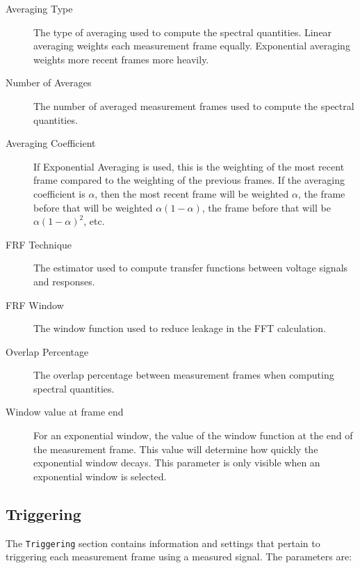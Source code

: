 \documentclass[pdf,12pt,report]{SANDreport}
\newcommand{\inlineCode}{\lstinline[basicstyle=\bfseries\ttfamily]}
\begin{document}
    \begin{description}
        \item[Averaging Type] The type of averaging used to compute the spectral quantities.  Linear averaging weights each measurement frame equally.  Exponential averaging weights more recent frames more heavily.
        \item[Number of Averages] The number of averaged measurement frames used to compute the spectral quantities.
        \item[Averaging Coefficient] If Exponential Averaging is used, this is the weighting of the most recent frame compared to the weighting of the previous frames.  If the averaging coefficient is $\alpha$, then the most recent frame will be weighted $\alpha$, the frame before that will be weighted $\alpha(1-\alpha)$, the frame before that will be $\alpha(1-\alpha)^2$, etc.
        \item[FRF Technique] The estimator used to compute transfer functions between voltage signals and responses.
        \item[FRF Window] The window function used to reduce leakage in the \Ac{FFT} calculation.
        \item[Overlap Percentage] The overlap percentage between measurement frames when computing spectral quantities.
        \item[Window value at frame end] For an exponential window, the value of the window function at the end of the measurement frame.  This value will determine how quickly the exponential window decays.  This parameter is only visible when an exponential window is selected.
    \end{description}
    
    \subsection{Triggering}
    The \inlineCode{Triggering} section contains information and settings that pertain to triggering each measurement frame using a measured signal.  The parameters are:
    
\end{document}
